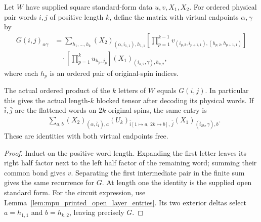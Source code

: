 \begin{definition}
    \label{def:mpu_printed_open_contraction}
    \leanok
    Let $W$ have supplied square standard-form data $u,v,X_1,X_2$.
    For ordered physical pair words $i,j$ of positive length $k$, define
    the matrix with virtual endpoints $\alpha,\gamma$ by
    \begin{align*}
        G(i,j)_{\alpha\gamma}
         & =\sum_{h_1,\ldots,h_k}(X_2)_{(\alpha,i_{1,1}),h_{1,1}}
        \left[\prod_{p=1}^{k-1}v_{(i_{p,2},i_{p+1,1}),(h_{p,2},h_{p+1,1})}\right] \\
         & \quad\cdot\left[\prod_{p=1}^{k}u_{h_p,j_p}\right]
        (X_1)_{(i_{k,2},\gamma),h_{k,2}},
    \end{align*}
    where each $h_p$ is an ordered pair of original-spin indices.
\end{definition}

\begin{lemma}
    \label{lem:mpu_actual_printed_open_contraction}
    \leanok
    The actual ordered product of the $k$ letters of $W$ equals $G(i,j)$.
    In particular this gives the actual length-$k$ blocked tensor after
    decoding its physical words. If $\bar i,\bar j$ are the flattened
    words on $2k$ original spins, the same entry is
    \begin{align*}
         & \sum_{a,b}(X_2)_{(\alpha,\bar i_1),a}
        (U_k)_{\bar i[1\mapsto a,\,2k\mapsto b],\,\bar j}
        (X_1)_{(\bar i_{2k},\gamma),b}.
    \end{align*}
    These are identities with both virtual endpoints free.
\end{lemma}
\begin{proof}\leanok
    Induct on the positive word length. Expanding the first letter leaves
    its right half factor next to the left half factor of the remaining
    word; summing their common bond gives $v$. Separating the first
    intermediate pair in the finite sum gives the same recurrence for
    $G$. At length one the identity is the supplied open standard form.
    For the circuit expression, use
    Lemma~\ref{lem:mpu_printed_open_layer_entries}. Its two exterior
    deltas select $a=h_{1,1}$ and $b=h_{k,2}$, leaving precisely $G$.
\end{proof}

